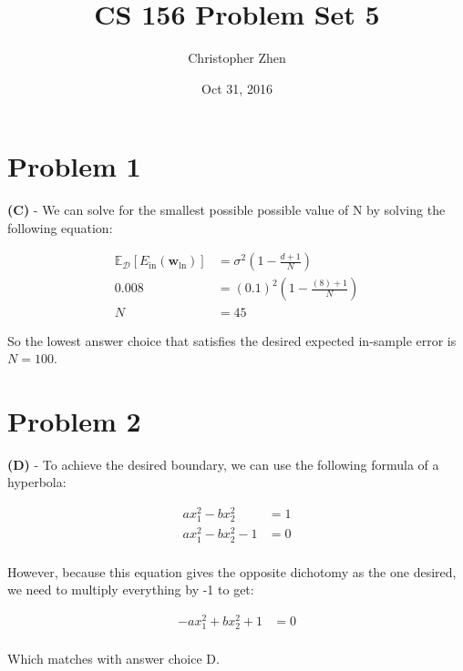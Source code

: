 \documentclass[10pt,letter]{article}
\begin{document}


\title{CS 156 Problem Set 5}

\author{Christopher Zhen}

\date{Oct 31, 2016}
 
\maketitle 

\section*{Problem 1}

\textbf{(C)} - We can solve for the smallest possible possible value of N by solving the following equation:

\begin{align*}
\mathbb{E}_\mathcal{D}[E_\textrm{in}(\boldsymbol{w}_\textrm{ln})] & = \sigma^2(1 - \frac{d+1}{N}) \\
0.008 & = (0.1)^2(1 - \frac{(8)+1}{N}) \\
N & = 45
\end{align*}

So the lowest answer choice that satisfies the desired expected in-sample error is $N = 100$.

\section*{Problem 2}

\textbf{(D)} - To achieve the desired boundary, we can use the following formula of a hyperbola:

\begin{align*}
ax_1^2 - bx_2^2 & = 1 \\
ax_1^2 - bx_2^2 -1 & = 0 \\
\end{align*}

However, because this equation gives the opposite dichotomy as the one desired, we need to multiply everything by -1 to get:

\begin{align*}
-ax_1^2 + bx_2^2 +1 & = 0 \\
\end{align*}

Which matches with answer choice D.
\end{document}
